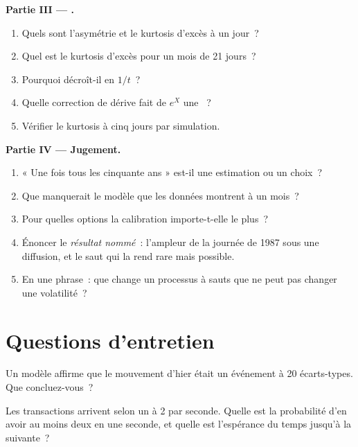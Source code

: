 \begin{problem}
\medskip\noindent\textbf{Partie III --- .}
\begin{enumerate}[resume]
\item Quels sont l'asymétrie et le kurtosis d'excès à un jour~?
\item Quel est le kurtosis d'excès pour un mois de 21 jours~?
\item Pourquoi décroît-il en $1/t$~?
\item Quelle correction de dérive fait de $e^X$ une ~?
\item Vérifier le kurtosis à cinq jours par simulation.
\end{enumerate}

\medskip\noindent\textbf{Partie IV --- Jugement.}
\begin{enumerate}[resume]
\item « Une fois tous les cinquante ans » est-il une estimation ou un choix~?
\item Que manquerait le modèle que les données montrent à un mois~?
\item Pour quelles options la calibration importe-t-elle le plus~?
\item Énoncer le \emph{résultat nommé}~: l'ampleur de la journée de 1987 sous une diffusion, et le saut qui la rend rare mais possible.
\item En une phrase~: que change un processus à sauts que ne peut pas changer une volatilité~?
\end{enumerate}
\end{problem}

\section{Questions d'entretien}

\begin{interviewq}\label{iq:qm:jump-processes:1}
Un modèle affirme que le mouvement d'hier était un événement à 20 écarts-types. Que concluez-vous~?
\end{interviewq}

\begin{interviewq}\label{iq:qm:jump-processes:2}
Les transactions arrivent selon un  à 2 par seconde. Quelle est la probabilité d'en avoir au moins deux en une seconde, et
quelle est l'espérance du temps jusqu'à la suivante~?
\end{interviewq}

